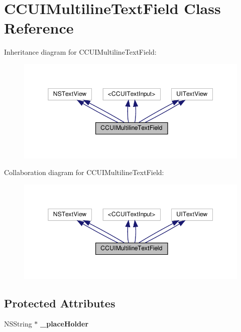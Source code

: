 \hypertarget{interfaceCCUIMultilineTextField}{}\section{C\+C\+U\+I\+Multiline\+Text\+Field Class Reference}
\label{interfaceCCUIMultilineTextField}


Inheritance diagram for C\+C\+U\+I\+Multiline\+Text\+Field\+:
\nopagebreak
\begin{figure}[H]
\begin{center}
\leavevmode
\includegraphics[width=350pt]{interfaceCCUIMultilineTextField__inherit__graph}
\end{center}
\end{figure}


Collaboration diagram for C\+C\+U\+I\+Multiline\+Text\+Field\+:
\nopagebreak
\begin{figure}[H]
\begin{center}
\leavevmode
\includegraphics[width=350pt]{interfaceCCUIMultilineTextField__coll__graph}
\end{center}
\end{figure}
\subsection*{Protected Attributes}
\begin{DoxyCompactItemize}
\item 
\mbox{\label{interfaceCCUIMultilineTextField_ae93701c2270635a2a7f2c4e5c7d5a7ab}} 
N\+S\+String $\ast$ {\bfseries \+\_\+place\+Holder}
\end{DoxyCompactItemize}
